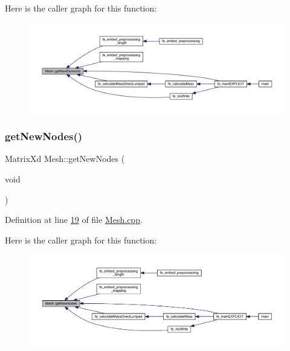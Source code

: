Here is the caller graph for this function\+:\nopagebreak
\begin{figure}[H]
\begin{center}
\leavevmode
\includegraphics[width=350pt]{class_mesh_a6e425e9499e64ab52c4555aa3763651d_icgraph}
\end{center}
\end{figure}
\mbox{\label{class_mesh_a52ecce406bbef80cbf3610db3ea5ea40}} 
\subsubsection{\texorpdfstring{get\+New\+Nodes()}{getNewNodes()}}
{\footnotesize\ttfamily Matrix\+Xd Mesh\+::get\+New\+Nodes (\begin{DoxyParamCaption}\item[{void}]{ }\end{DoxyParamCaption})}



Definition at line \hyperlink{_mesh_8cpp_source_l00019}{19} of file \hyperlink{_mesh_8cpp_source}{Mesh.\+cpp}.

Here is the caller graph for this function\+:\nopagebreak
\begin{figure}[H]
\begin{center}
\leavevmode
\includegraphics[width=350pt]{class_mesh_a52ecce406bbef80cbf3610db3ea5ea40_icgraph}
\end{center}
\end{figure}
\mbox{\label{class_mesh_ad41670edd4e6335071012837a58fb725}} 
